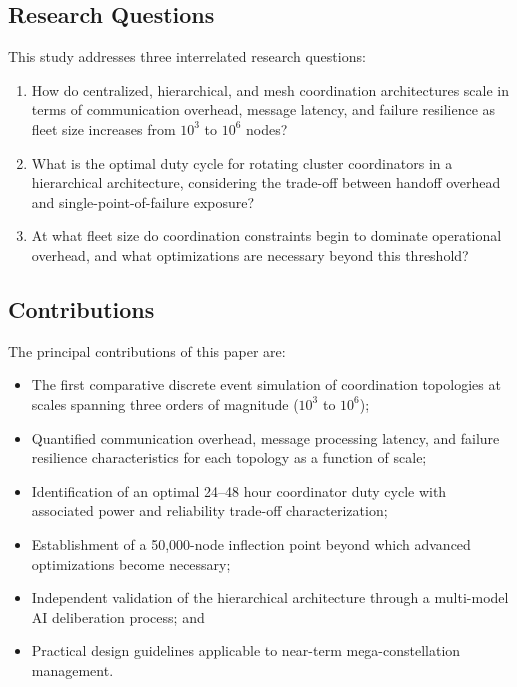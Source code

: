 \documentclass[journal]{IEEEtran}
\begin{document}
\subsection{Research Questions}

This study addresses three interrelated research questions:

\begin{enumerate}
    \item[\textbf{RQ1:}] How do centralized, hierarchical, and mesh coordination architectures scale in terms of communication overhead, message latency, and failure resilience as fleet size increases from $10^3$ to $10^6$ nodes?
    \item[\textbf{RQ2:}] What is the optimal duty cycle for rotating cluster coordinators in a hierarchical architecture, considering the trade-off between handoff overhead and single-point-of-failure exposure?
    \item[\textbf{RQ3:}] At what fleet size do coordination constraints begin to dominate operational overhead, and what optimizations are necessary beyond this threshold?
\end{enumerate}

\subsection{Contributions}

The principal contributions of this paper are:
\begin{itemize}
    \item The first comparative discrete event simulation of coordination topologies at scales spanning three orders of magnitude ($10^3$ to $10^6$);
    \item Quantified communication overhead, message processing latency, and failure resilience characteristics for each topology as a function of scale;
    \item Identification of an optimal 24--48 hour coordinator duty cycle with associated power and reliability trade-off characterization;
    \item Establishment of a 50{,}000-node inflection point beyond which advanced optimizations become necessary;
    \item Independent validation of the hierarchical architecture through a multi-model AI deliberation process; and
    \item Practical design guidelines applicable to near-term mega-constellation management.
\end{itemize}
\end{document}
